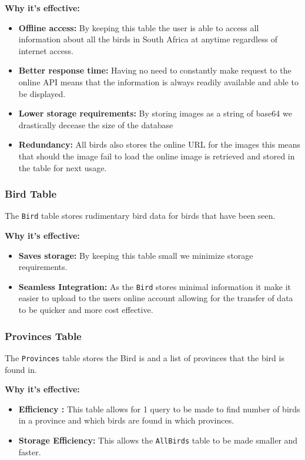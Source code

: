\documentclass{article}
\begin{document}
\textbf{Why it's effective:}
\begin{itemize}
    \item \textbf{Offline access:} By keeping this table the user is able to access all information about all the birds in South Africa at anytime regardless of internet access.
    \item \textbf{Better response time:} Having no need to constantly make request to the online API means that the information is always readily available and able to be displayed.
    \item \textbf{Lower storage requirements:} By storing images as a string of base64 we drastically decease the size of the database 
    \item \textbf{Redundancy:} All birds also stores the online URL for the images this means that should the image fail to load the online image is retrieved and stored in the table for next usage.
\end{itemize}

\subsubsection{Bird Table }
The \texttt{Bird} table stores rudimentary bird data for birds that have been seen.

\textbf{Why it's effective:}
\begin{itemize}
    \item \textbf{Saves storage:} By keeping this table small we minimize storage requirements.
    \item \textbf{Seamless Integration:} As the \texttt{Bird} stores minimal information it make it easier to upload to the users online account allowing for the transfer of data to be quicker and more cost effective.
\end{itemize}

\subsubsection{Provinces Table }
The \texttt{Provinces} table stores the Bird is and a list of provinces that the bird is found in.

\textbf{Why it's effective:}
\begin{itemize}
    \item \textbf{Efficiency :} This table allows for 1 query to be made to find number of birds in a province and which birds are found in which provinces.
    \item \textbf{Storage Efficiency:} This allows the \texttt{AllBirds} table to be made smaller and faster.
\end{itemize}
\end{document}
